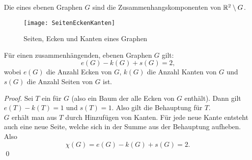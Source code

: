 \begin{minipage}{.45\textwidth}
  \begin{definition}[Seiten]
    Die \label{def:seiten} eines ebenen Graphen \( G \) sind die Zusammenhangskomponenten von \( \mathbb{R}^2 \setminus G \).
  \end{definition}
\end{minipage}
\hfill
\begin{minipage}{.45\textwidth}
  \begin{figure}[H]
    \texttt{[image: SeitenEckenKanten]}
    \caption{Seiten, Ecken und Kanten eines Graphen}
  \end{figure}
\end{minipage}

\begin{theorem}
  Für einen zusammenhängenden, ebenen Graphen \( G \) gilt:
  \begin{equation*}
   e(G) - k(G) + s(G) = 2\text{,}
  \end{equation*}
  wobei \( e(G) \) die Anzahl Ecken von \( G \), \( k(G) \) die Anzahl Kanten von \( G \) und \( s(G) \) die Anzahl Seiten von \( G \) ist. \\
  \begin{proof}
    Sei \( T \) ein \label{def:aufspannenderBaum} für \( G \) (also ein Baum der alle Ecken von \( G \) enthält). Dann gilt \( e(T)-k(T) = 1 \) und \( s(T) = 1 \). Also gilt die Behauptung für \( T \). \\
    \( G \) erhält man aus \( T \) durch Hinzufügen von Kanten. Für jede neue Kante entsteht auch eine neue Seite, welche sich in der Summe aus der Behauptung aufheben. Also
    \begin{equation*}
      \chi(G) = e(G)-k(G)+s(G) = 2\text{.}
    \end{equation*}\qed{}
  \end{proof}
\end{theorem}

